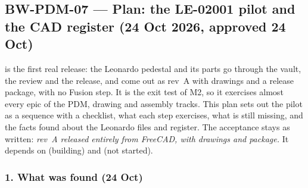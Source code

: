 \subsection{BW-PDM-07 --- Plan: the LE-02001 pilot and the CAD register (24 Oct 2026, approved 24 Oct)}\label{sec:pdm07-plan}

 is the first real release: the Leonardo pedestal  and its parts go through the vault, the
review and the release, and come out as rev~A with drawings and a release package, with no Fusion step. It is the exit
test of M2, so it exercises almost every epic of the PDM, drawing and assembly tracks. This plan sets out the pilot as a
sequence with a checklist, what each step exercises, what is still missing, and the facts found about the Leonardo files
and register. The acceptance stays as written: \emph{ rev~A released entirely from FreeCAD, with drawings
and package.} It depends on  (building) and  (not started).

\subsubsection*{1. What was found (24 Oct)}

